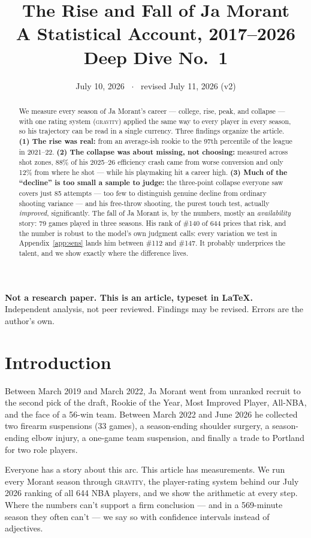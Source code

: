 \documentclass[11pt]{article}
\title{\textbf{The Rise and Fall of Ja Morant}\\[4pt]
\large A Statistical Account, 2017--2026\\[2pt]
\normalsize \gravity{} Deep Dive No.\ 1}
\author{}
\date{July 10, 2026 \ $\cdot$ \ revised July 11, 2026 (v2)}
\newcommand{\gravity}{\textsc{gravity}}
\newcommand{\statusnote}{\par\noindent\begin{center}%
\colorbox{fade!25}{\parbox{0.93\textwidth}{\centering\small
\textbf{Not a research paper. This is an article, typeset in \LaTeX.}\\[2pt]
Independent analysis, not peer reviewed. Findings may be revised. Errors are the author's own.}}%
\end{center}\smallskip}
\begin{document}
\maketitle
\vspace{-2.5em}
\statusnote

\begin{abstract}
\noindent
We measure every season of Ja Morant's career --- college, rise, peak, and collapse ---
with one rating system (\gravity{}) applied the same way to every player in every season,
so his trajectory can be read in a single currency. Three findings organize the article.
\textbf{(1) The rise was real:} from an average-ish rookie to the 97th percentile of the
league in 2021--22. \textbf{(2) The collapse was about missing, not choosing:} measured
across shot zones, 88\% of his 2025--26 efficiency crash came from worse conversion and
only 12\% from where he shot --- while his playmaking hit a career high. \textbf{(3) Much
of the ``decline'' is too small a sample to judge:} the three-point collapse everyone saw
covers just 85 attempts --- too few to distinguish genuine decline from ordinary shooting
variance --- and his free-throw shooting, the purest touch test, actually \emph{improved},
significantly. The fall of Ja Morant is, by the numbers, mostly an \emph{availability}
story: 79 games played in three seasons. His rank of \#140 of 644 prices that risk, and
the number is robust to the model's own judgment calls: every variation we test in
Appendix~\ref{app:sens} lands him between \#112 and \#147. It probably underprices the
talent, and we show exactly where the difference lives.
\end{abstract}

\section{Introduction}

Between March 2019 and March 2022, Ja Morant went from unranked recruit to the second
pick of the draft, Rookie of the Year, Most Improved Player, All-NBA, and the face of a
56-win team. Between March 2022 and June 2026 he collected two firearm suspensions
(33 games), a season-ending shoulder surgery, a season-ending elbow injury, a one-game
team suspension, and finally a trade to Portland for two role players.

Everyone has a story about this arc. This article has measurements. We run every Morant
season through \gravity{}, the player-rating system behind our July 2026 ranking of all
644 NBA players, and we show the arithmetic at every step. Where the numbers can't support
a firm conclusion --- and in a 569-minute season they often can't --- we say so with
confidence intervals instead of adjectives.
\end{document}
